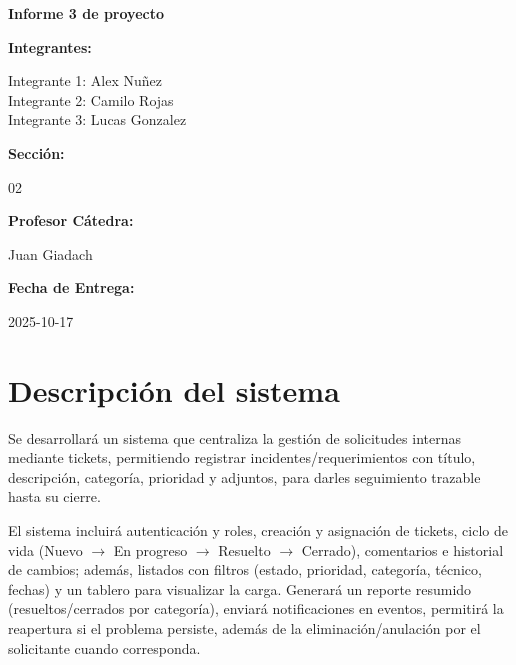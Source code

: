 \documentclass[12pt,a4paper]{article}
\begin{document}
\begin{titlepage}
    \centering
    \vspace*{2cm}
    
    {\huge\bfseries Informe 3 de proyecto\par}
    \vspace{2cm}
    
    {\Large\bfseries Integrantes:\par}
    \vspace{0.5cm}
    {\large
    Integrante 1: Alex Nuñez\\
    Integrante 2: Camilo Rojas\\
    Integrante 3: Lucas Gonzalez\par}
    
    \vspace{1.5cm}
    
    {\Large\bfseries Sección:\par}
    \vspace{0.3cm}
    {\large 02\par}
    
    \vspace{1.5cm}
    
    {\Large\bfseries Profesor Cátedra:\par}
    \vspace{0.3cm}
    {\large Juan Giadach\par}
    
    \vspace{1.5cm}
    
    {\Large\bfseries Fecha de Entrega:\par}
    \vspace{0.3cm}
    {\large 2025-10-17\par}
    
    \vfill
\end{titlepage}

\tableofcontents
\newpage

\section{Descripción del sistema}

Se desarrollará un sistema que centraliza la gestión de solicitudes internas mediante tickets, permitiendo registrar incidentes/requerimientos con título, descripción, categoría, prioridad y adjuntos, para darles seguimiento trazable hasta su cierre.

El sistema incluirá autenticación y roles, creación y asignación de tickets, ciclo de vida (Nuevo $\rightarrow$ En progreso $\rightarrow$ Resuelto $\rightarrow$ Cerrado), comentarios e historial de cambios; además, listados con filtros (estado, prioridad, categoría, técnico, fechas) y un tablero para visualizar la carga. Generará un reporte resumido (resueltos/cerrados por categoría), enviará notificaciones en eventos, permitirá la reapertura si el problema persiste, además de la eliminación/anulación por el solicitante cuando corresponda.
\end{document}
